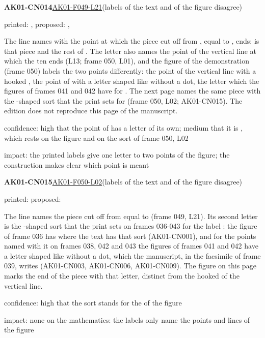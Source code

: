 \documentclass[11pt]{article}
\begin{document}
\noindent\textbf{AK01-CN014}\enspace\hyperlink{AK01-F049-L21}{AK01-F049-L21}\enspace(labels of the text and of the figure disagree)\par\noindent printed: , \enspace proposed: , \par\noindent The line names with  the point at which the piece cut off from , equal to , ends:  is that piece and  the rest of . The letter  also names the point of the vertical line at which the ten ends (L13; frame 050, L01), and the figure of the demonstration (frame 050) labels the two points differently: the point of the vertical line with a hooked , the point of  with a letter shaped like  without a dot, the letter which the figures of frames 041 and 042 have for . The next page names the same piece with the -shaped sort that the print sets for  (frame 050, L02; AK01-CN015). The edition does not reproduce this page of the manuscript.\par\noindent confidence: high that the point of  has a letter of its own; medium that it is , which rests on the figure and on the sort of frame 050, L02\par\noindent impact: the printed labels give one letter to two points of the figure; the construction makes clear which point is meant\par\medskip
\noindent\textbf{AK01-CN015}\enspace\hyperlink{AK01-F050-L02}{AK01-F050-L02}\enspace(labels of the text and of the figure disagree)\par\noindent printed: \enspace proposed: \par\noindent The line names the piece cut off from  equal to  (frame 049, L21). Its second letter is the -shaped sort that the print sets on frames 036-043 for the label : the figure of frame 036 has  where the text has that sort (AK01-CN001), and for the points named with it on frames 038, 042 and 043 the figures of frames 041 and 042 have a letter shaped like  without a dot, which the manuscript, in the facsimile of frame 039, writes  (AK01-CN003, AK01-CN006, AK01-CN009). The figure on this page marks the end of the piece with that letter, distinct from the hooked  of the vertical line.\par\noindent confidence: high that the sort stands for the  of the figure\par\noindent impact: none on the mathematics: the labels only name the points and lines of the figure\par\medskip
\end{document}
